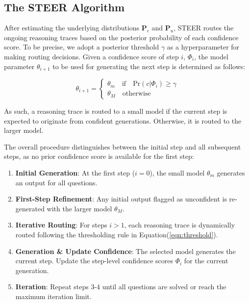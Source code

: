 \documentclass[letterpaper]{article} %
\begin{document}
\subsection{The STEER Algorithm} 

After estimating the underlying distributions $\mathbf{P}_c$ and $\mathbf{P}_u$, STEER routes the ongoing reasoning traces based on the posterior probability of each confidence score. To be precise, we adopt a posterior threshold $\gamma$ as a hyperparameter for making routing decisions. Given a confidence score of step $i$, $\Phi_i$, the model parameter $\theta_{i+1}$ to be used for generating the next step is determined as follows:

\begin{equation}
    \theta_{i+1} = 
    \begin{cases}
    \theta_m \quad \text{if} \quad \text{Pr}(c|\Phi_i) \geq \gamma \\
    \theta_M \quad \text{otherwise}
    \end{cases}
\label{eqn:threshold}
\end{equation}

\noindent As such, a reasoning trace is routed to a small model if the current step is expected to originate from confident generations. Otherwise, it is routed to the larger model. 

The overall procedure distinguishes between the initial step and all subsequent steps, as no prior confidence score is available for the first step:

\begin{enumerate}[label=\textbf{\arabic*.}, leftmargin=2em, itemsep=0.8ex]
    \item \textbf{Initial Generation}: At the first step ($i=0$), the small model $\theta_m$ generates an output for all questions.
    \vspace{-0.1cm}
    \item \textbf{First-Step Refinement}: Any initial output flagged as unconfident is re-generated with the larger model $\theta_M$.
    \vspace{-0.1cm}
    \item \textbf{Iterative Routing}: For steps $i>1$, each reasoning trace is dynamically routed following the thresholding rule in Equation(\ref{eqn:threshold}). 
    \vspace{-0.1cm}
    \item \textbf{Generation \& Update Confidence}: The selected model generates the current step. Update the step-level confidence scores $\Phi_i$ for the current generation. 
    \vspace{-0.1cm}
    \item \textbf{Iteration}: Repeat steps 3-4 until all questions are solved or reach the maximum iteration limit.
\end{enumerate}
 
\end{document}
